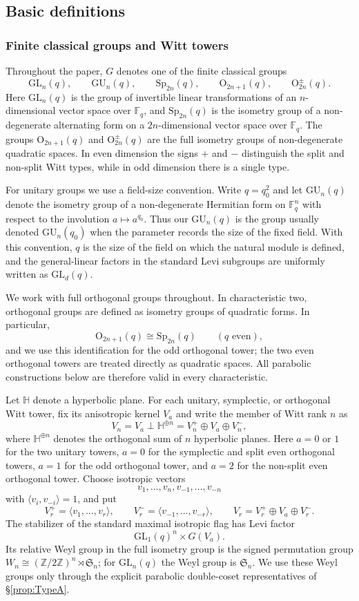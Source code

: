 \documentclass[12pt]{amsart}
\numberwithin{itemcounter}{subsection}
\theoremstyle{plain}
\theoremstyle{definition}
\theoremstyle{remark}
\numberwithin{equation}{section}
\def\bbF{\mathbb{F}}
\def\bbH{\mathbb{H}}
\def\bbZ{\mathbb{Z}}
\def\frakS{\mathfrak{S}}
\def\O{\mathrm{O}}
\def\Sp{\mathrm{Sp}}
\def\GL{\mathrm{GL}}
\def\GU{\mathrm{GU}}
\begin{document}
\subsection{Basic definitions}
\subsubsection{Finite classical groups and Witt towers}
Throughout the paper, $G$ denotes one of the finite classical groups
\[
 \GL_n(q),\qquad \GU_n(q),\qquad \Sp_{2n}(q),\qquad
 \O_{2n+1}(q),\qquad \O_{2n}^{\pm}(q).
\]
Here $\GL_n(q)$ is the group of invertible linear transformations of an
$n$-dimensional vector space over $\bbF_q$, and $\Sp_{2n}(q)$ is the
isometry group of a non-degenerate alternating form on a
$2n$-dimensional vector space over $\bbF_q$.  The groups
$\O_{2n+1}(q)$ and $\O_{2n}^{\pm}(q)$ are the full isometry groups of
non-degenerate quadratic spaces.  In even dimension the signs $+$ and
$-$ distinguish the split and non-split Witt types, while in odd
dimension there is a single type.

For unitary groups we use a field-size convention.  Write $q=q_0^2$ and
let $\GU_n(q)$ denote the isometry group of a non-degenerate Hermitian
form on $\bbF_q^n$ with respect to the involution
$a\mapsto a^{q_0}$.  Thus our $\GU_n(q)$ is the group usually denoted
$\GU_n(q_0)$ when the parameter records the size of the fixed field.
With this convention, $q$ is the size of the field on which the natural
module is defined, and the general-linear factors in the standard Levi
subgroups are uniformly written as $\GL_d(q)$.

We work with full orthogonal groups throughout.  In characteristic two,
orthogonal groups are defined as isometry groups of quadratic forms.  In
particular,
\[
 \O_{2n+1}(q)\cong\Sp_{2n}(q)\qquad(q\text{ even}),
\]
and we use this identification for the odd orthogonal tower; the two
even orthogonal towers are treated directly as quadratic spaces.  All
parabolic constructions below are therefore valid in every
characteristic.

Let $\bbH$ denote a hyperbolic plane.  For each unitary, symplectic, or
orthogonal Witt tower, fix its anisotropic kernel $V_a$ and write the
member of Witt rank $n$ as
\[
 V_n=V_a\perp\bbH^{\oplus n}
    =V_n^+\oplus V_a\oplus V_n^-,
\]
where $\bbH^{\oplus n}$ denotes the orthogonal sum of $n$ hyperbolic
planes.
Here $a=0$ or $1$ for the two unitary towers, $a=0$ for the symplectic
and split even orthogonal towers, $a=1$ for the odd orthogonal tower,
and $a=2$ for the non-split even orthogonal tower.  Choose isotropic
vectors
\[
 v_1,\ldots,v_n,v_{-1},\ldots,v_{-n}
\]
with $\langle v_i,v_{-i}\rangle=1$, and put
\[
 V_r^+=\langle v_1,\ldots,v_r\rangle,
 \qquad
 V_r^-=\langle v_{-1},\ldots,v_{-r}\rangle,
 \qquad
 V_r=V_r^+\oplus V_a\oplus V_r^-.
\]
The stabilizer of the standard maximal isotropic flag has Levi factor
\[
 \GL_1(q)^n\times G(V_a).
\]
Its relative Weyl group in the full isometry group is the signed
permutation group
$W_n\cong(\bbZ/2\bbZ)^n\rtimes\frakS_n$; for $\GL_n(q)$ the Weyl group
is $\frakS_n$.  We use these Weyl groups only through the explicit
parabolic double-coset representatives of \S\ref{prop:TypeA}.
\end{document}
